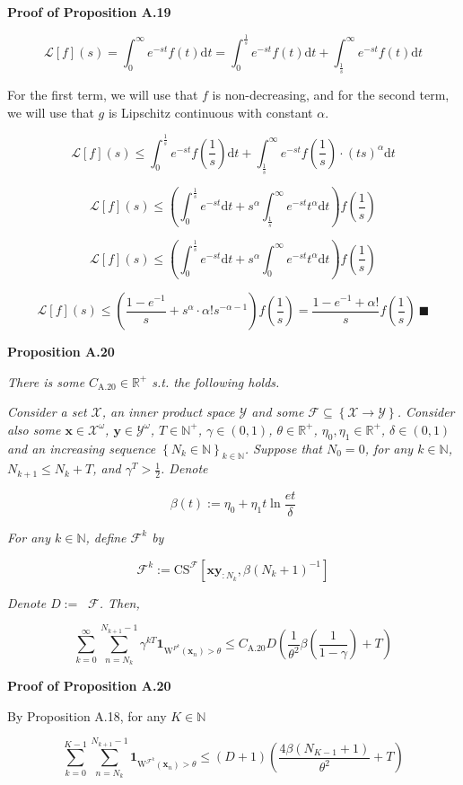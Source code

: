 \documentclass[a4paper]{article}
\newcommand{\Co}[1]{}
\newcommand{\AP}[1]{\left(#1\right)}
\newcommand{\AB}[1]{\left[#1\right]}
\newcommand{\AC}[1]{\left\{#1\right\}}
\newcommand{\Nats}{\mathbb{N}}
\newcommand{\Reals}{\mathbb{R}}
\newcommand{\D}{\mathrm{d}} %
\newcommand{\La}{\mathcal{L}}
\DeclareMathOperator{\RVO}{\dim_{RVO}}
\newcommand{\X}{\mathcal{X}}
\newcommand{\Y}{\mathcal{Y}}
\newcommand{\F}{\mathcal{F}}
\newcommand{\CS}{\mathrm{CS}}
\newcommand{\W}{\mathrm{W}}
\begin{document}
\textbf{Proof of Proposition A.19}\Co{b}

$$\La[f](s)=\int_0^\infty e^{-st}f(t)\D t=\int_0^{\frac{1}{s}}e^{-st}f(t)\D t+\int_{\frac{1}{s}}^\infty e^{-st}f(t)\D t$$

For the first term, we will use that $f$ is non-decreasing, and for the second term, we will use that $g$ is Lipschitz continuous with constant $\alpha$.

$$\La[f](s)\leq\int_0^{\frac{1}{s}}e^{-st}f\AP{\frac{1}{s}}\D t+\int_{\frac{1}{s}}^\infty e^{-st}f\AP{\frac{1}{s}}\cdot\AP{ts}^\alpha\D t$$

$$\La[f](s)\leq\AP{\int_0^{\frac{1}{s}}e^{-st}\D t+s^\alpha\int_{\frac{1}{s}}^\infty e^{-st}t^\alpha\D t}f\AP{\frac{1}{s}}$$

$$\La[f](s)\leq\AP{\int_0^{\frac{1}{s}}e^{-st}\D t+s^\alpha\int_{0}^\infty e^{-st}t^\alpha\D t}f\AP{\frac{1}{s}}$$

$$\La[f](s)\leq\AP{\frac{1-e^{-1}}{s}+s^\alpha\cdot\alpha!s^{-\alpha-1}}f\AP{\frac{1}{s}}=\frac{1-e^{-1}+\alpha!}{s}f\AP{\frac{1}{s}}\ \blacksquare$$

\textbf{Proposition A.20}\Co{b}

\textit{There is some $C_{\mathrm{A.20}}\in\Reals^+$ s.t. the following holds.}\Co{i}

\textit{Consider a set $\X$, an inner product space $\Y$ and some $\F\subseteq\AC{\X\rightarrow\Y}$. Consider also some $\boldsymbol{x}\in\X^\omega$, $\boldsymbol{y}\in\Y^\omega$, $T\in\Nats^+$, $\gamma\in(0,1)$, $\theta\in\Reals^+$, $\eta_0,\eta_1\in\Reals^+$, $\delta\in(0,1)$ and an increasing sequence $\AC{N_k\in\Nats}_{k\in\Nats}$. Suppose that $N_0=0$, for any $k\in\Nats$, $N_{k+1}\leq N_k+T$, and $\gamma^T>\frac{1}{2}$. Denote}\Co{i}

$$\beta(t):=\eta_0 + \eta_1t\ln{\frac{et}{\delta}}$$

\textit{For any $k\in\Nats$, define $\F^k$ by}\Co{i}

$$\F^k:=\CS^\F\AB{\boldsymbol{xy}_{:N_k},\beta\AP{N_k+1}^{-1}}$$

\textit{Denote $D:=\RVO\F$. Then,}\Co{i}

$$\sum_{k=0}^\infty\sum_{n=N_k}^{N_{k+1}-1}{\gamma^{kT}\boldsymbol{1}_{\W^{F^k}\AP{\boldsymbol{x}_{n}}>\theta}} \leq C_{\mathrm{A.20}}D\AP{\frac{1}{\theta^2}\beta\AP{\frac{1}{1-\gamma}}+T}$$

\textbf{Proof of Proposition A.20}\Co{b}

By Proposition A.18, for any $K\in\Nats$

$$\sum_{k=0}^{K-1}\sum_{n=N_k}^{N_{k+1}-1}{\boldsymbol{1}_{\W^{\F^k}\AP{\boldsymbol{x}_{n}}>\theta}
} \leq(D+1)\AP{\frac{4\beta\AP{N_{K-1}+1}}{\theta^{2}}+T}$$
\end{document}
